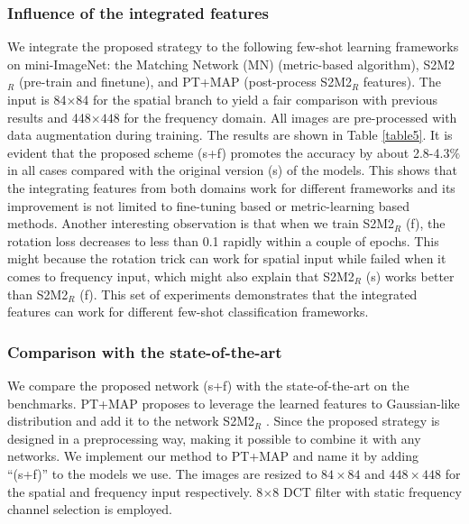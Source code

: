\documentclass[10pt, conference, compsocconf]{IEEEtran}
\begin{document}
\subsubsection{Influence of the integrated features}

We integrate the proposed strategy to the following few-shot learning frameworks on mini-ImageNet: the Matching Network (MN) \cite{vinyals2016matching} (metric-based algorithm), S2M2$_{R}$ \cite{mangla2020charting} (pre-train and finetune), and PT+MAP \cite{hu2020leveraging} (post-process S2M2$_{R}$ features). The input is 84$\times$84 for the spatial branch to yield a fair comparison with previous results and 448$\times 448$ for the frequency domain. All images are pre-processed with data augmentation during training. The results are shown in Table \ref{table5}. It is evident that the proposed scheme (s+f) promotes the accuracy by about 2.8-4.3$\%$ in all cases compared with the original version (s) of the models. This shows that the integrating features from both domains work for different frameworks and its improvement is not limited to fine-tuning based or metric-learning based methods. Another interesting observation is that when we train S2M2$_{R}$ (f), the rotation loss decreases to less than 0.1 rapidly within a couple of epochs. This might because the rotation trick can work for spatial input while failed when it comes to frequency input, which might also explain that S2M2$_{R}$ (s) works better than S2M2$_{R}$ (f). This set of experiments demonstrates that the integrated features can work for different few-shot classification frameworks.

\subsubsection{Comparison with the state-of-the-art}

We compare the proposed network (s+f) with the state-of-the-art on the benchmarks. PT+MAP \cite{hu2020leveraging} proposes to leverage the learned features to Gaussian-like distribution and add it to the network S2M2$_{R}$ \cite{mangla2020charting}. Since the proposed strategy is designed in a preprocessing way, making it possible to combine it with any networks. We implement our method to PT+MAP and name it by adding \enquote{(s+f)} to the models we use. The images are resized to $84\times 84$ and $448\times 448$ for the spatial and frequency input respectively. 8$\times$8 DCT filter with static frequency channel selection is employed. 
\end{document}
